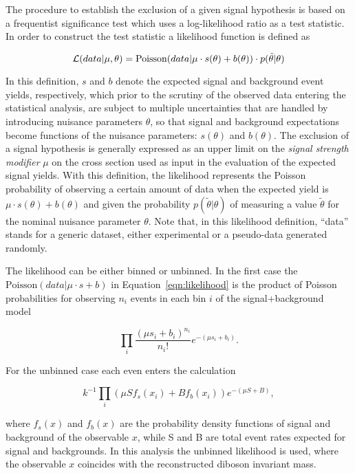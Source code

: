 The procedure to establish the exclusion of a given signal hypothesis is based on a frequentist significance test which uses a log-likelihood ratio as a test statistic.
In order to construct the test statistic a likelihood function is defined as

\begin{equation}\label{eqn:likelihood}
{\cal L}( data | \mu,\theta) = \mathrm{Poisson}(data | \mu\cdot s(\theta) + b(\theta))\cdot p(\tilde{\theta}|\theta)
\end{equation}

In this definition, $s$ and $b$ denote the expected signal and background event yields, respectively,
which prior to the scrutiny of the observed data entering the statistical analysis, are subject to multiple uncertainties that are handled by introducing nuisance parameters $\theta$,
so that signal and background expectations become functions of the nuisance parameters: $s(\theta)$ and $b(\theta)$.
The exclusion of a signal hypothesis is generally expressed as an upper limit on the {\itshape signal strength modifier} $\mu$
on the cross section used as input in the evaluation of the expected signal yields.
With this definition, the likelihood represents the Poisson probability of observing a certain amount of data when the expected yield is $\mu\cdot s(\theta) + b(\theta)$
and given the probability $p(\tilde{\theta}|\theta)$ of measuring a value $\tilde{\theta}$ for the nominal nuisance parameter $\theta$.
Note that, in this likelihood definition, ``data'' stands for a generic dataset, either experimental or a pseudo-data generated randomly.

The likelihood can be either binned or unbinned. In the first case the $\mathrm{Poisson}(data | \mu\cdot s + b)$ in Equation~\ref{eqn:likelihood} is the product of Poisson probabilities
for observing $n_i$ events in each bin $i$ of the signal+background model

\begin{equation}\label{eqn:binned}
\prod_i \frac{(\mu s_{i} +b_{i})^{n_i}}{n_i!}e^{-(\mu s_i + b_i)}.
\end{equation}

For the unbinned case each even enters the calculation

\begin{equation}\label{eqn:unbinned}
k^{-1}\prod_i (\mu S f_s(x_i) + Bf_b(x_i))e^{-(\mu S + B)},
\end{equation}

where $f_s(x)$ and $f_b(x)$ are the probability density functions of signal and background of the observable $x$, while S and B are total event rates expected for signal and backgrounds.
In this analysis the unbinned likelihood is used, where the observable $x$ coincides with the reconstructed diboson invariant mass.\\

